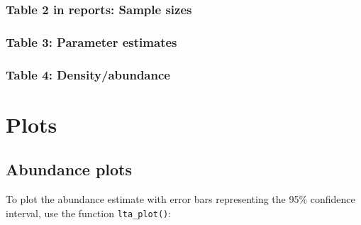\documentclass[
]{book}
\newenvironment{Shaded}{\begin{snugshade}}{\end{snugshade}}
\newcommand{\DataTypeTok}[1]{\textcolor[rgb]{0.13,0.29,0.53}{#1}}
\newcommand{\KeywordTok}[1]{\textcolor[rgb]{0.13,0.29,0.53}{\textbf{#1}}}
\newcommand{\NormalTok}[1]{#1}
\newcommand{\OperatorTok}[1]{\textcolor[rgb]{0.81,0.36,0.00}{\textbf{#1}}}
\newcommand{\StringTok}[1]{\textcolor[rgb]{0.31,0.60,0.02}{#1}}
\begin{document}
\hypertarget{table-2-in-reports-sample-sizes}{%
\subsubsection*{Table 2 in reports: Sample sizes}\label{table-2-in-reports-sample-sizes}}

\begin{Shaded}
\end{Shaded}

\hypertarget{table-3-parameter-estimates}{%
\subsubsection*{Table 3: Parameter estimates}\label{table-3-parameter-estimates}}

\hypertarget{table-4-densityabundance}{%
\subsubsection*{Table 4: Density/abundance}\label{table-4-densityabundance}}

\hypertarget{plots}{%
\section*{Plots}\label{plots}}

\hypertarget{abundance-plots}{%
\subsection*{Abundance plots}\label{abundance-plots}}

To plot the abundance estimate with error bars representing the 95\% confidence interval, use the function \texttt{lta\_plot()}:
\end{document}
